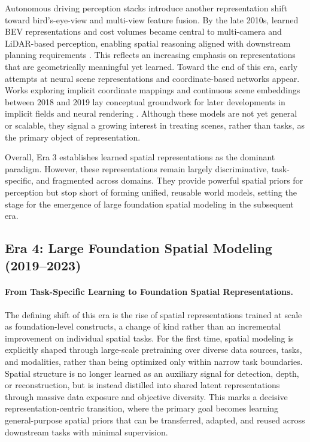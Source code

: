 Autonomous driving perception stacks introduce another representation shift toward bird's-eye-view and multi-view feature fusion.
By the late 2010s, learned BEV representations and cost volumes became central to multi-camera and LiDAR-based perception, enabling spatial reasoning aligned with downstream planning requirements \cite{liu2023bevfusion,yao2018mvsnet,kendall2017end}.
This reflects an increasing emphasis on representations that are geometrically meaningful yet learned.
Toward the end of this era, early attempts at neural scene representations and coordinate-based networks appear.
Works exploring implicit coordinate mappings and continuous scene embeddings between 2018 and 2019 lay conceptual groundwork for later developments in implicit fields and neural rendering \cite{park2019deepsdf,mescheder2019occupancy,sitzmann2019scene}.
Although these models are not yet general or scalable, they signal a growing interest in treating scenes, rather than tasks, as the primary object of representation.



Overall, Era 3 establishes learned spatial representations as the dominant paradigm.
However, these representations remain largely discriminative, task-specific, and fragmented across domains.
They provide powerful spatial priors for perception but stop short of forming unified, reusable world models, setting the stage for the emergence of large foundation spatial modeling in the subsequent era.
















\subsection{Era 4: Large Foundation Spatial Modeling (2019--2023)}
\label{subsec:era-foundation-models}



\paragraph{From Task-Specific Learning to Foundation Spatial Representations.}
The defining shift of this era is the rise of spatial representations trained at scale as foundation-level constructs, a change of kind rather than an incremental improvement on individual spatial tasks.
For the first time, spatial modeling is explicitly shaped through large-scale pretraining over diverse data sources, tasks, and modalities, rather than being optimized only within narrow task boundaries.
Spatial structure is no longer learned as an auxiliary signal for detection, depth, or reconstruction, but is instead distilled into shared latent representations through massive data exposure and objective diversity.
This marks a decisive representation-centric transition, where the primary goal becomes learning general-purpose spatial priors that can be transferred, adapted, and reused across downstream tasks with minimal supervision.




